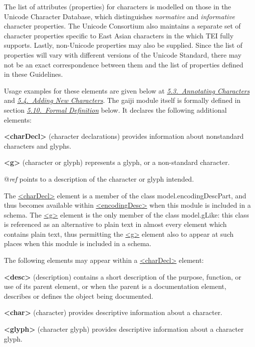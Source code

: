 The list of attributes (properties) for characters is modelled on those in the Unicode Character Database, which distinguishes \textit{normative} and \textit{informative} character properties. The Unicode Consortium also maintains a separate set of character properties specific to East Asian characters in the  which TEI fully supports. Lastly, non-Unicode properties may also be supplied. Since the list of properties will vary with different versions of the Unicode Standard, there may not be an exact correspondence between them and the list of properties defined in these Guidelines.\par
Usage examples for these elements are given below at \textit{\hyperref[D25-30]{5.3.\ Annotating Characters}} and \textit{\hyperref[D25-40]{5.4.\ Adding New Characters}}. The gaiji module itself is formally defined in section \textit{\hyperref[WSD-DEF]{5.10.\ Formal Definition}} below. It declares the following additional elements: 
\begin{sansreflist}
  
\item [\textbf{<charDecl>}] (character declarations) provides information about nonstandard characters and glyphs.
\item [\textbf{<g>}] (character or glyph) represents a glyph, or a non-standard character.\hfil\\[-10pt]\begin{sansreflist}
    \item[@{\itshape ref}]
  points to a description of the character or glyph intended.
\end{sansreflist}  
\end{sansreflist}
 The \hyperref[TEI.charDecl]{<charDecl>} element is a member of the class \textsf{model.encodingDescPart}, and thus becomes available within \hyperref[TEI.encodingDesc]{<encodingDesc>} when this module is included in a schema. The \hyperref[TEI.g]{<g>} element is the only member of the class \textsf{model.gLike}: this class is referenced as an alternative to plain text in almost every element which contains plain text, thus permitting the \hyperref[TEI.g]{<g>} element also to appear at such places when this module is included in a schema.\par
The following elements may appear within a \hyperref[TEI.charDecl]{<charDecl>} element: 
\begin{sansreflist}
  
\item [\textbf{<desc>}] (description) contains a short description of the purpose, function, or use of its parent element, or when the parent is a documentation element, describes or defines the object being documented. 
\item [\textbf{<char>}] (character) provides descriptive information about a character.
\item [\textbf{<glyph>}] (character glyph) provides descriptive information about a character glyph.
\end{sansreflist}
